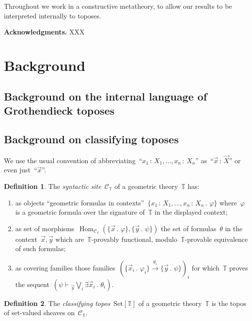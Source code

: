 \documentclass[oneside,reqno]{amsart}
\theoremstyle{definition}
\newtheorem{defn}{Definition}[section]
\theoremstyle{plain}
\theoremstyle{remark}
\newcommand{\C}{\mathcal{C}}
\newcommand{\TT}{\mathbb{T}}
\DeclareMathOperator{\Hom}{Hom}
\newcommand{\Set}{\mathrm{Set}}
\renewcommand{\_}{\mathpunct{.}\,}
\newcommand{\?}{\,{:}\,}
\renewcommand{\paragraph}[1]{\noindent\textbf{#1.}}
\newcommand{\seq}[1]{\mathrel{\vdash\!\!\!_{#1}}}
\begin{document}
Throughout we work in a constructive metatheory, to allow our results to be
interpreted internally to toposes.
\medskip


\paragraph{Acknowledgments} XXX


\section{Background}
\label{sect:review}

\subsection{Background on the internal language of Grothendieck toposes}
\label{sect:review-language}



\subsection{Background on classifying toposes}
\label{sect:review-classifying-toposes}

We use the usual convention of abbreviating~``$x_1\?X_1,\ldots,x_n\?X_n$''
as~``$\vec x \? \vec X$'' or even just~``$\vec x$''.

\begin{defn}The \emph{syntactic site}~$\C_\TT$ of a geometric theory~$\TT$ has:
\begin{enumerate}
\item as objects ``geometric formulas in contexts''~$\{x_1\?X_1,\ldots,x_n\?X_n\_
\varphi\}$ where~$\varphi$ is a geometric formula over the signature of~$\TT$
in the displayed context; \smallskip
\item as set of morphisms~$\Hom_{\C_\TT}(\{\vec x\_
\varphi\}, \{\vec y\_ \psi\})$ the set of formulas~$\theta$ in the
context~$\vec x, \vec y$ which are~$\TT$-provably functional,
modulo~$\TT$-provable equivalence of such formulas; \smallskip
\item as covering families those families~$(\{\vec x_i\_ \varphi_i\} \xrightarrow{\theta_i}
\{\vec y\_ \psi\})_i$ for which~$\TT$ proves the sequent~$(\psi \seq{\vec y} \bigvee_i \exists \vec x_i\_
\theta_i)$.
\end{enumerate}
\end{defn}

\begin{defn}The \emph{classifying topos}~$\Set[\TT]$ of a geometric
theory~$\TT$ is the topos of set-valued sheaves on~$\C_\TT$.\end{defn}
\end{document}
